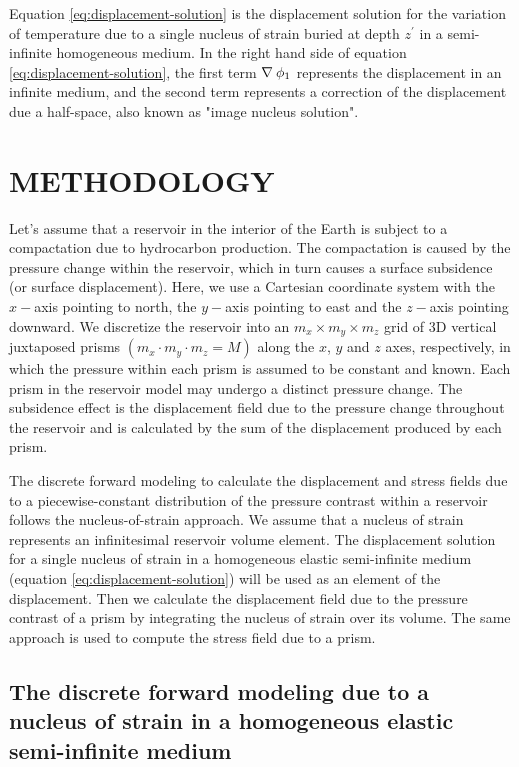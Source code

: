\documentclass[journal abbreviation, manuscript]{copernicus}
\begin{document}
Equation \ref{eq:displacement-solution} is the displacement solution for the variation of temperature due to a single nucleus of strain buried at depth $z^{\prime}$ in a
semi-infinite homogeneous medium. 
In the right hand side of equation \ref{eq:displacement-solution}, the first term 
$ {\bf{\nabla}} \: \phi_{1} $ represents the displacement in an infinite medium, and the second term represents a correction of the displacement due a half-space, also known as "image nucleus solution".

\section{METHODOLOGY}

Let's assume that a reservoir in the interior of the Earth is subject to a compactation due to hydrocarbon production. 
The compactation is caused by the pressure change within the reservoir, which in turn causes  a surface subsidence (or surface displacement). 
Here, we use a Cartesian coordinate system with the $x-$axis pointing to north, the $y-$axis pointing to east and the $z-$axis pointing downward.
We discretize the reservoir into an $ m_{x} \times m_{y} \times m_{z} $ grid of 3D vertical juxtaposed prisms $(m_{x} \cdot m_{y} \cdot m_{z} = M)$ along the 
$x$, $y$ and $z$ axes, respectively, in which the pressure within each prism is 
assumed to be constant and known. 
Each prism in the reservoir model may undergo a distinct pressure change.
The subsidence effect is the displacement field due to the pressure change throughout the reservoir and is calculated by the sum of the displacement produced by each prism.


The discrete forward modeling to calculate the displacement and stress fields due to a piecewise-constant distribution of the pressure contrast within a reservoir follows the nucleus-of-strain approach. 
We assume that a nucleus of strain represents an infinitesimal reservoir volume 
element. The displacement solution for a single nucleus of strain in a homogeneous elastic semi-infinite medium (equation \ref{eq:displacement-solution}) will be used as an element of the displacement.
Then we calculate the displacement field due to the pressure contrast of a prism by integrating the nucleus of strain over its volume. The same approach is used to 
compute the stress field due to a prism.


\subsection{The discrete forward modeling due to a nucleus of strain in a homogeneous elastic semi-infinite medium}\label{solution-nucleus}
\end{document}
